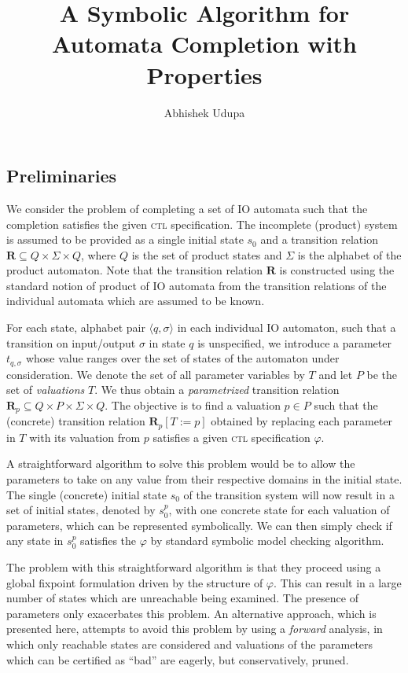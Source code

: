 \documentclass[10pt]{article}
\title{A Symbolic Algorithm for Automata Completion with \ctl
  Properties}
\author{Abhishek Udupa}
\date{}
\newcommand{\ctl}{\textsc{ctl}\xspace}
\newcommand{\ptrans}{\ensuremath{\mathbf{R}_p}\xspace}
\newcommand{\ctrans}{\ensuremath{\mathbf{R}}\xspace}
\begin{document}
\begin{spacing}{1}
\maketitle

\section{Preliminaries}
We consider the problem of completing a set of IO automata such that the
completion satisfies the given \ctl specification. The incomplete (product)
system is assumed to be provided as a single initial state $s_0$ and a
transition relation $\ctrans \subseteq Q \times \Sigma \times Q$, where $Q$
is the set of product states and $\Sigma$ is the alphabet of the product
automaton. Note that the transition relation $\ctrans$ is constructed using
the standard notion of product of IO automata from the transition relations
of the individual automata which are assumed to be known.

For each state, alphabet pair $\langle q, \sigma\rangle$ in each individual
IO automaton, such that a transition on input/output $\sigma$ in state $q$
is unspecified, we introduce a parameter $t_{q,\sigma}$ whose value ranges
over the set of states of the automaton under consideration. We denote the
set of all parameter variables by $T$ and let $P$ be the set of
\emph{valuations} $T$. We thus obtain a \emph{parametrized} transition
relation $\ptrans \subseteq Q \times P \times \Sigma \times Q$. The
objective is to find a valuation $p \in P$ such that the (concrete)
transition relation $\ptrans[T := p]$ obtained by replacing each parameter
in $T$ with its valuation from $p$ satisfies a given \ctl specification
$\varphi$.

A straightforward algorithm to solve this problem would be to allow the
parameters to take on any value from their respective domains in the
initial state. The single (concrete) initial state $s_0$ of the transition
system will now result in a set of initial states, denoted by $s_0^p$, with
one concrete state for each valuation of parameters, which can be
represented symbolically. We can then simply check if any state in $s_0^p$
satisfies the $\varphi$ by standard symbolic model checking algorithm.

The problem with this straightforward algorithm is that they proceed using
a global fixpoint formulation driven by the structure of $\varphi$. This
can result in a large number of states which are unreachable being
examined. The presence of parameters only exacerbates this problem. An
alternative approach, which is presented here, attempts to avoid this
problem by using a \emph{forward} analysis, in which only reachable states
are considered and valuations of the parameters which can be certified as
``bad'' are eagerly, but conservatively, pruned.


\end{spacing}
\end{document}
